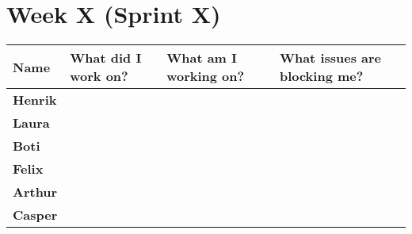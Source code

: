 \documentclass[landscape]{article}
\begin{document}
    \section{Week X (Sprint X)}
    \begin{table}[H]
        \begin{center}
            \begin{tabularx}{\linewidth}{L|L|L|L}
                
                \textbf{Name} & \textbf{What did I work on?} & \textbf{What am I working on? }& \textbf{What issues are blocking me?} \\
                \hline
                \textbf{Henrik} &  &  &  \\
                \hline
                \textbf{Laura} & & & \\
                \hline
                \textbf{Boti} & & & \\
                \hline
                \textbf{Felix} & & & \\
                \hline
                \textbf{Arthur} & & & \\
                \hline
                \textbf{Casper} &  &  & 
            \end{tabularx}
        \end{center}
    \end{table}
\end{document}
